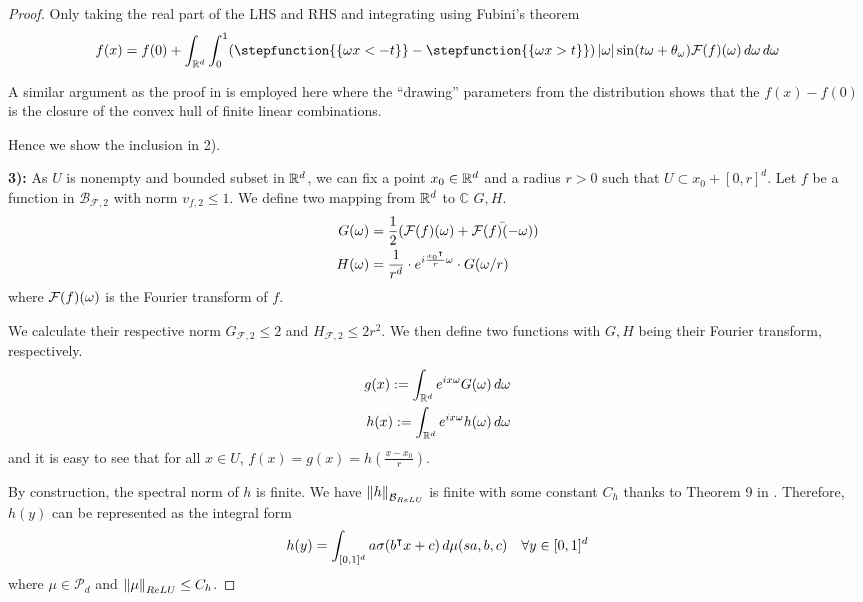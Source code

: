 \begin{proof}
Only taking the real part of the LHS and RHS and integrating using Fubini's theorem
\begin{equation}
    f(x) = f(0) + \int_{\R^d} \int_0^1 (
        \stepfunction{\{\omega x<-t\}} - \stepfunction{\{\omega x>t\}}
    ) \abs{\omega} \sin(t\omega + \theta_{\omega})
    \fourier{f}(\omega)\,d\omega\,d\omega
\end{equation}

A similar argument as the proof in  is employed here
where the ``drawing'' parameters from the distribution shows that the $f(x) -
f(0)$ is the closure of the convex hull of finite linear combinations.

Hence we show the inclusion in 2).

\textbf{3):} As $U$ is nonempty and bounded subset in $\mathbb{R}^d$, we can fix a point
$x_0 \in \mathbb{R}^d$ and a radius $r > 0$ such that $U \subset x_0 + [0, r]^d$. Let
$f$ be a function in $\mathcal{B}_{\mathcal{F},2}$ with norm $v_{f,2}\leq 1$.
We define two mapping from $\mathbb{R}^d$ to $\mathbb{C}$ $G, H$.
\begin{align*}
    G(\omega) &= \frac{1}{2} (\mathcal{F}(f)(\omega) 
                    + \bar{\mathcal{F}(f)(-\omega)}) \\
    H(\omega) &= \frac{1}{r^d} \cdot 
                    e^{i \frac{x_0{}^{\intercal}}{r} \omega} \cdot 
                    G(\omega / r)
\end{align*}
where $\mathcal{F}(f)(\omega)$ is the Fourier transform of $f$.

We calculate their respective norm $G_{\mathcal{F},2} \leq 2$ and
$H_{\mathcal{F},2} \leq 2r^2$. We then define two functions with $G,H$ being
their Fourier transform, respectively.
\begin{align*}
    g(x) := \int_{\mathbb{R}^d} e^{ix\omega} G(\omega)\,d\omega\\
    h(x) := \int_{\mathbb{R}^d} e^{ix\omega} h(\omega)\,d\omega\\
\end{align*}
and it is easy to see that for all $x \in U$, $f(x)=g(x)=h(\frac{x-x_0}{r})$.

By construction, the spectral norm of $h$ is finite. We have
$\left\| h \right\|_{\mathcal{B}_{ReLU}}$ is finite with some constant $C_h$ thanks to
Theorem 9 in \cite{eMathematicalUnderstandingNeural2020}. Therefore, $h(y)$ can
be represented as the integral form
\begin{equation}
    h(y) = \int_{[0,1]^d} a \sigma(b{}^{\intercal} x + c) \,d\mu(sa,b,c) \quad \forall y \in [0,1]^d
\end{equation}
where $\mu \in \mathcal{P}_d$ and $\left\| \mu \right\|_{ReLU} \leq C_h$.


\end{proof}
